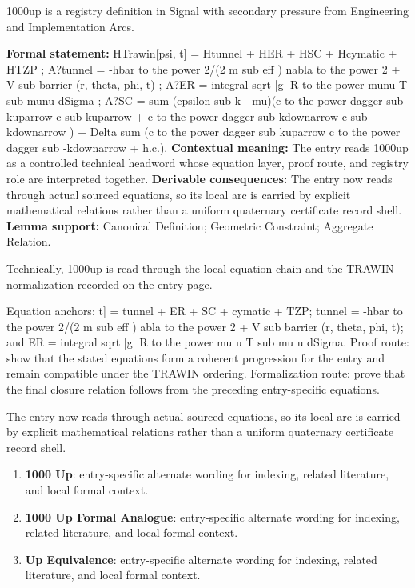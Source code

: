 
\begingroup\small
{}
1000up is a registry definition in Signal with secondary pressure from Engineering and Implementation Arcs.

\begingroup\footnotesize\setlength{\emergencystretch}{3em}\sloppy
\textbf{Formal statement:} HTrawin[psi, t] = Htunnel + HER + HSC + Hcymatic + HTZP ; A?tunnel = -hbar to the power 2/(2 m sub eff ) nabla to the power 2 + V sub barrier (r, theta, phi, t) ; A?ER = integral sqrt |g| R to the power munu T sub munu dSigma ; A?SC = sum (epsilon sub k - mu)(c to the power dagger sub kuparrow c sub kuparrow + c to the power dagger sub kdownarrow c sub kdownarrow ) + Delta sum (c to the power dagger sub kuparrow c to the power dagger sub -kdownarrow + h.c.). \textbf{Contextual meaning:} The entry reads 1000up as a controlled technical headword whose equation layer, proof route, and registry role are interpreted together. \textbf{Derivable consequences:} The entry now reads through actual sourced equations, so its local arc is carried by explicit mathematical relations rather than a uniform quaternary certificate record shell. \textbf{Lemma support:} Canonical Definition; Geometric Constraint; Aggregate Relation.\par
\endgroup

Technically, 1000up is read through the local equation chain and the TRAWIN normalization recorded on the entry page.

Equation anchors: t] =  tunnel +  ER +  SC +  cymatic +  TZP;   tunnel = -hbar to the power 2/(2 m sub eff ) abla to the power 2 + V sub barrier (r, theta, phi, t); and   ER = integral sqrt |g| R to the power mu u T sub mu u dSigma. Proof route: show that the stated equations form a coherent progression for the entry and remain compatible under the TRAWIN ordering. Formalization route: prove that the final closure relation follows from the preceding entry-specific equations.

The entry now reads through actual sourced equations, so its local arc is carried by explicit mathematical relations rather than a uniform quaternary certificate record shell.
\endgroup

\begin{enumerate}[leftmargin=1.6em,itemsep=6pt,topsep=4pt]
\item \textbf{1000 Up}: entry-specific alternate wording for indexing, related literature, and local formal context.
\item \textbf{1000 Up Formal Analogue}: entry-specific alternate wording for indexing, related literature, and local formal context.
\item \textbf{Up Equivalence}: entry-specific alternate wording for indexing, related literature, and local formal context.
\end{enumerate}

